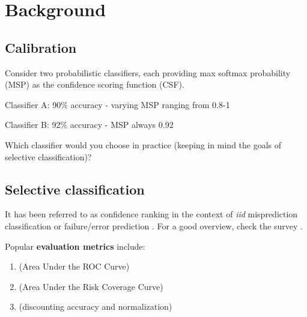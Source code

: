 
\section{Background}

\subsection{Calibration}



\noindent \begin{uuyellowbox}[title=Top-1 calibration does not imply good failure prediction \cite{zhu2022rethinking}]

    Consider two probabilistic classifiers, each providing max softmax probability (MSP) as the confidence scoring function (CSF).\newline

    Classifier A: 90\% accuracy - varying MSP ranging from 0.8-1
    
    Classifier B: 92\% accuracy - MSP always 0.92\newline

    Which classifier would you choose in practice (keeping in mind the goals of selective classification)?
    
\end{uuyellowbox}



\subsection{Selective classification}

It has been referred to as confidence ranking in the context of \textit{iid} misprediction classification or failure/error prediction \cite{jaeger2023a}. For a good overview, check the survey \cite{zhang2023survey}. 

\noindent Popular \textbf{evaluation metrics} include:
\begin{enumerate}
    \item \AUROC{} (Area Under the ROC Curve)
    \item \AURC{} (Area Under the Risk Coverage Curve) \citep{geifman2017selective,jaeger2023a} 
    \item \EAURC{} (discounting accuracy and normalization) \citep{geifman2018bias}
\end{enumerate}


